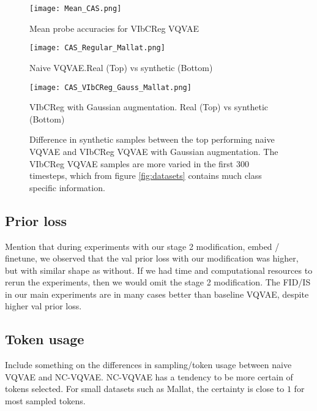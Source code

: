 \documentclass[../../thesis.tex]{subfiles}
\begin{document}
\begin{figure}[H]
    \label{fig:Mean_CAS}
    \texttt{[image: Mean\_CAS.png]}
    \centering  
    \caption{Mean probe accuracies for VIbCReg VQVAE}
\end{figure}



\begin{figure}[H]
    \label{fig:RvsS_Mallat}
    \centering
    \begin{minipage}[b]{0.4\textwidth}
        \centering
        \texttt{[image: CAS\_Regular\_Mallat.png]}
        \caption*{Naive VQVAE.\newline Real (Top) vs synthetic (Bottom)}
    \end{minipage}
    \begin{minipage}[b]{0.4\textwidth}
        \centering
        \texttt{[image: CAS\_VIbCReg\_Gauss\_Mallat.png]}
        \caption*{VIbCReg with Gaussian augmentation. Real (Top) vs synthetic (Bottom)}
    \end{minipage}

    \caption{Difference in synthetic samples between the top performing naive VQVAE and VIbCReg VQVAE with Gaussian augmentation. The VIbCReg VQVAE samples are more varied in the first 300 timesteps, which from figure \ref{fig:datasets} contains much class specific information.}
\end{figure}


\subsection{Prior loss}
Mention that during experiments with our stage 2 modification, embed / finetune, we observed that the val prior loss with our modification was higher, but with similar shape as without. If we had time and computational resources to rerun the experiments, then we would omit the stage 2 modification. The FID/IS in our main experiments are in many cases better than baseline VQVAE, despite higher val prior loss.
\newline

\subsection{Token usage}

Include something on the differences in sampling/token usage between naive VQVAE and NC-VQVAE. NC-VQVAE has a tendency to be more certain of tokens selected. For small datasets such as Mallat, the certainty is close to $1$ for most sampled tokens. 
\end{document}
